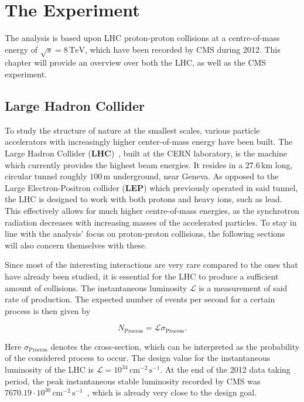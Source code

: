 \chapter{The Experiment}
\label{cha:experiment}

The analysis is based upon LHC proton-proton collisions at a centre-of-mass energy of $\sqrt{s} = 8\,\text{TeV}$, which have been recorded by CMS during 2012. This chapter will provide an overview over both the LHC, as well as the CMS experiment.


\section{Large Hadron Collider}
\label{sec:lhc} 

To study the structure of nature at the smallest scales, various particle accelerators with increasingly higher center-of-mass energy have been built. The Large Hadron Collider (\textbf{LHC})~\cite{lhcjinst}, built at the CERN laboratory, is the machine which currently provides the highest beam energies. It resides in a $27.6\,\text{km}$ long, circular tunnel roughly $100\,\text{m}$ underground, near Geneva. As opposed to the Large Electron-Positron collider (\textbf{LEP}) which previously operated in said tunnel, the LHC is designed to work with both protons and heavy ions, such as lead. This effectively allows for much higher centre-of-mass energies, as the synchrotron radiation decreases with increasing masses of the accelerated particles. To stay in line with the analysis' focus on proton-proton collisions, the following sections will also concern themselves with these.

Since most of the interesting interactions are very rare compared to the ones that have already been studied, it is essential for the LHC to produce a sufficient amount of collisions. The instantaneous luminosity $\mathcal{L}$ is a measurement of said rate of production. The expected number of events per second for a certain process is then given by

\begin{equation}
  \label{eq:instlumi}
  N_{\text{Process}} = \mathcal{L} \sigma_{\text{Process}}.
\end{equation}

\noindent Here $\sigma_{\text{Process}}$ denotes the cross-section, which can be interpreted as the probability of the considered process to occur. The design value for the instantaneous luminosity of the LHC is $\mathcal{L} = 10^{34}\,\text{cm}^{-2}\,\text{s}^{-1}$. At the end of the 2012 data taking period, the peak instantaneous stable luminosity recorded by CMS was $7670.19 \cdot 10^{30}\,\text{cm}^{-2}\,\text{s}^{-1}$~\cite{cmslumi}, which is already very close to the design goal.


